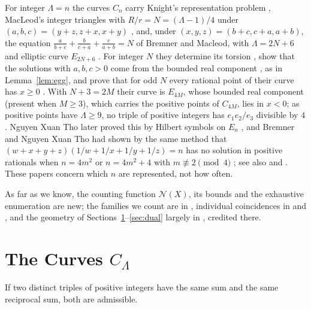 \documentclass[10pt]{article}
\newcommand{\N}{\mathcal{N}}
\begin{document}
For integer $\Lambda=n$ the curves $C_n$ carry Knight's representation problem \cite{bgn1993}, MacLeod's integer triangles with $R/r=N=(\Lambda-1)/4$ under $(a,b,c)=(y+z,z+x,x+y)$ \cite{macleod2005}, and, under $(x,y,z)=(b+c,c+a,a+b)$, the equation $\frac a{b+c}+\frac b{c+a}+\frac c{a+b}=N$ of Bremner and Macleod, with $\Lambda=2N+6$ and elliptic curve $E_{2N+6}$ \cite{bremnermacleod2014}. For integer $N$ they determine its torsion \cite[Lemma~2.1]{bremnermacleod2014}, show that the solutions with $a,b,c>0$ come from the bounded real component \cite[Section~4]{bremnermacleod2014}, as in Lemma~\ref{lem:egg}, and prove that for odd $N$ every rational point of their curve has $x\ge0$ \cite[Theorem~5.1 and Corollary~5.2]{bremnermacleod2014}. With $N+3=2M$ their curve is $E_{4M}$, whose bounded real component (present when $M\ge3$), which carries the positive points of $C_{4M}$, lies in $x<0$; as positive points have $\Lambda\ge9$, no triple of positive integers has $e_1e_2/e_3$ divisible by $4$. Nguyen Xuan Tho later proved this by Hilbert symbols on $E_n$ \cite[Theorem~1.1]{tho2021}, and Bremner and Nguyen Xuan Tho had shown by the same method that $(w+x+y+z)(1/w+1/x+1/y+1/z)=n$ has no solution in positive rationals when $n=4m^2$ or $n=4m^2+4$ with $m\not\equiv2\pmod 4$ \cite[Theorems~8, 9, and~14]{bremnertho2018}; see also \cite[p.~130]{bgn1993} and \cite{zhang2016}. These papers concern which $n$ are represented, not how often.

As far as we know, the counting function $\N(X)$, its bounds and the exhaustive enumeration are new; the families we count are in \cite{choudhry2011}, individual coincidences in \cite[(3)]{choudhry2011} and \cite{chen2025}, and the geometry of Sections~\ref{sec:curves}--\ref{sec:dual} largely in \cite{bgn1993,beauville1982,kubert1976}, credited there.

\section{The Curves \texorpdfstring{$C_\Lambda$}{C\_Lambda}}\label{sec:curves}

\begin{lemma}\label{lem:admissible}
If two distinct triples of positive integers have the same sum and the same reciprocal sum, both are admissible.
\end{lemma}
\end{document}
